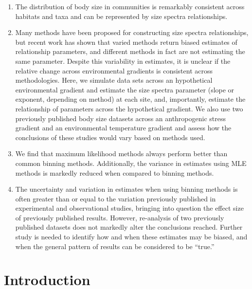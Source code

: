 \documentclass[
]{article}
\providecommand{\tightlist}{%
  \setlength{\itemsep}{0pt}\setlength{\parskip}{0pt}}
\begin{document}
\begin{enumerate}
\def\labelenumi{\arabic{enumi}.}
\tightlist
\item
  The distribution of body size in communities is remarkably consistent
  across habitats and taxa and can be represented by size spectra
  relationships.
\item
  Many methods have been proposed for constructing size spectra
  relationships, but recent work has shown that varied methods return
  biased estimates of relationship parameters, and different methods in
  fact are not estimating the same parameter. Despite this variability
  in estimates, it is unclear if the relative change across
  environmental gradients is consistent across methodologies. Here, we
  simulate data sets across an hypothetical environmental gradient and
  estimate the size spectra parameter (slope or exponent, depending on
  method) at each site, and, importantly, estimate the relationship of
  parameters across the hypothetical gradient. We also use two
  previously published body size datasets across an anthropogenic stress
  gradient and an environmental temperature gradient and assess how the
  conclusions of these studies would vary based on methods used.
\item
  We find that maximum likelihood methods always perform better than
  common binning methods. Additionally, the variance in estimates using
  MLE methods is markedly reduced when compared to binning methods.
\item
  The uncertainty and variation in estimates when using binning methods
  is often greater than or equal to the variation previously published
  in experimental and observational studies, bringing into question the
  effect size of previously published results. However, re-analysis of
  two previously published datasets does not markedly alter the
  conclusions reached. Further study is needed to identify how and when
  these estimates may be biased, and when the general pattern of results
  can be considered to be ``true.''
\end{enumerate}

\hypertarget{introduction}{%
\section{Introduction}\label{introduction}}
\end{document}
